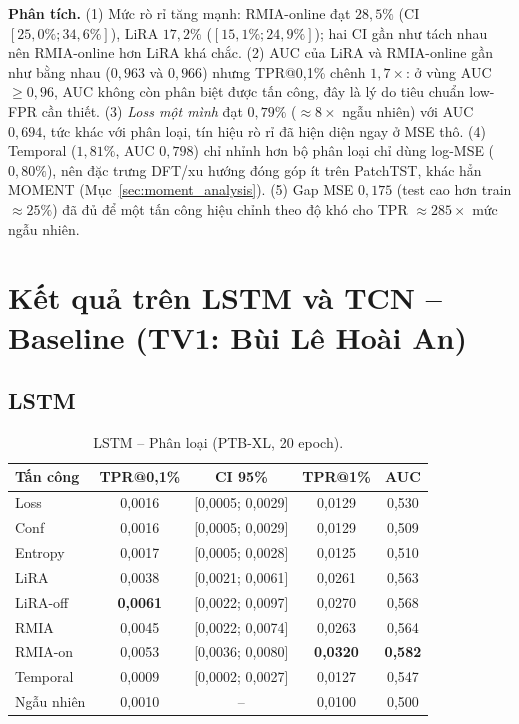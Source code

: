 \documentclass[12pt,a4paper]{report}
\begin{document}
\textbf{Phân tích.} (1) Mức rò rỉ tăng mạnh: RMIA-online đạt $28{,}5\%$ (CI $[25{,}0\%; 34{,}6\%]$), LiRA $17{,}2\%$ ($[15{,}1\%; 24{,}9\%]$); hai CI gần như tách nhau nên RMIA-online hơn LiRA khá chắc. (2) AUC của LiRA và RMIA-online gần như bằng nhau ($0{,}963$ và $0{,}966$) nhưng TPR@0,1\% chênh $1{,}7\times$: ở vùng AUC $\ge 0{,}96$, AUC không còn phân biệt được tấn công, đây là lý do tiêu chuẩn low-FPR cần thiết. (3) \textit{Loss một mình} đạt $0{,}79\%$ ($\approx 8\times$ ngẫu nhiên) với AUC $0{,}694$, tức khác với phân loại, tín hiệu rò rỉ đã hiện diện ngay ở MSE thô. (4) Temporal ($1{,}81\%$, AUC $0{,}798$) chỉ nhỉnh hơn bộ phân loại chỉ dùng log-MSE ($0{,}80\%$), nên đặc trưng DFT/xu hướng đóng góp ít trên PatchTST, khác hẳn MOMENT (Mục~\ref{sec:moment_analysis}). (5) Gap MSE $0{,}175$ (test cao hơn train $\approx 25\%$) đã đủ để một tấn công hiệu chỉnh theo độ khó cho TPR $\approx 285\times$ mức ngẫu nhiên.

\section{Kết quả trên LSTM và TCN -- Baseline (TV1: Bùi Lê Hoài An)}

\subsection{LSTM}

\begin{table}[H]
\centering
\caption{LSTM -- Phân loại (PTB-XL, 20 epoch).}
\label{tab:lstm_cls}
\begin{tabular}{lcccc}
\toprule
\textbf{Tấn công} & \textbf{TPR@0,1\%} & \textbf{CI 95\%} & \textbf{TPR@1\%} & \textbf{AUC} \\
\midrule
Loss      & 0,0016 & [0,0005; 0,0029] & 0,0129 & 0,530 \\
Conf      & 0,0016 & [0,0005; 0,0029] & 0,0129 & 0,509 \\
Entropy   & 0,0017 & [0,0005; 0,0028] & 0,0125 & 0,510 \\
LiRA      & 0,0038 & [0,0021; 0,0061] & 0,0261 & 0,563 \\
LiRA-off  & \textbf{0,0061} & [0,0022; 0,0097] & 0,0270 & 0,568 \\
RMIA      & 0,0045 & [0,0022; 0,0074] & 0,0263 & 0,564 \\
RMIA-on   & 0,0053 & [0,0036; 0,0080] & \textbf{0,0320} & \textbf{0,582} \\
Temporal  & 0,0009 & [0,0002; 0,0027] & 0,0127 & 0,547 \\
\midrule
Ngẫu nhiên & 0,0010 & -- & 0,0100 & 0,500 \\
\bottomrule
\end{tabular}
\end{table}
\end{document}
